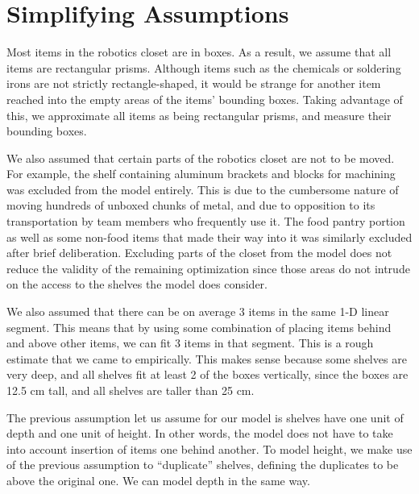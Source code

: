 \documentclass[10pt]{article}
\theoremstyle{named}
\begin{document}
\section{Simplifying Assumptions}
\par
Most items in the robotics closet are in boxes. As a result, we assume that all
items are rectangular prisms. Although items such as the chemicals or soldering irons
are not strictly rectangle-shaped, it would be strange for another item reached into
the empty areas of the items' bounding boxes. Taking advantage of this, we approximate
all items as being rectangular prisms, and measure their bounding boxes.
\par
We also assumed that certain parts of the robotics closet are not to be moved. For
example, the shelf containing aluminum brackets and blocks for machining was excluded
from the model entirely. This is due to the cumbersome nature of moving hundreds of
unboxed chunks of metal, and due to opposition to its transportation by team members
who frequently use it. The food pantry portion as well as some non-food items that
made their way into it was similarly excluded after brief deliberation. Excluding
parts of the closet from the model does not reduce the validity of the remaining
optimization since those areas do not intrude on the access to the shelves the model does consider.
\par
We also assumed that there can be on average 3 items in the same 1-D linear
segment. This means that by using some combination of placing items behind
and above other items, we can fit 3 items in that segment. This is a rough
estimate that we came to empirically. This makes sense because some shelves are
very deep, and all shelves fit at least 2 of the boxes vertically, since
the boxes are 12.5 cm tall, and all shelves are taller than 25 cm. 
\par
The previous assumption let us assume for our model is shelves have one unit of depth
and one unit of height. In other words, the model does not have to take into account
insertion of items one behind another. To model height, we make use of the previous
assumption to ``duplicate'' shelves, defining the duplicates to be above the original
one. We can model depth in the same way. 
\end{document}
